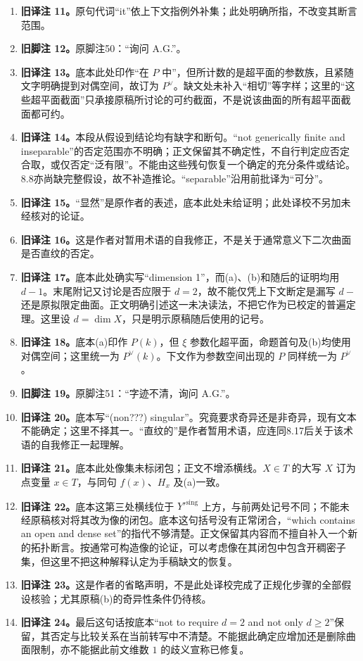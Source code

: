\begin{enumerate}
\item \textbf{旧译注 11。}原句代词“it”依上下文指例外补集；此处明确所指，不改变其断言范围。
\item \textbf{旧脚注 12。}原脚注50：“询问 A.G.”。
\item \textbf{旧译注 13。}底本此处印作“在 $P$ 中”，但所计数的是超平面的参数族，且紧随文字明确提到对偶空间，故订为 $P^\vee$。缺文处未补入“相切”等字样；这里的“这些超平面截面”只承接原稿所讨论的可约截面，不是说该曲面的所有超平面截面都可约。
\item \textbf{旧译注 14。}本段从假设到结论均有缺字和断句。“not generically finite and inseparable”的否定范围亦不明确；正文保留其不确定性，不自行判定应否定合取，或仅否定“泛有限”。不能由这些残句恢复一个确定的充分条件或结论。8.8亦尚缺完整假设，故不补造推论。“separable”沿用前批译为“可分”。
\item \textbf{旧译注 15。}“显然”是原作者的表述，底本此处未给证明；此处译校不另加未经核对的论证。
\item \textbf{旧译注 16。}这是作者对暂用术语的自我修正，不是关于通常意义下二次曲面是否直纹的否定。
\item \textbf{旧译注 17。}底本此处确实写“dimension 1”，而(a)、(b)和随后的证明均用 $d-1$。末尾附记又讨论是否应限于 $d=2$，故不能仅凭上下文断定是漏写 $d-$ 还是原拟限定曲面。正文明确引述这一未决读法，不把它作为已校定的普遍定理。这里设 $d=\dim X$，只是明示原稿随后使用的记号。
\item \textbf{旧译注 18。}底本(a)印作 $P(k)$，但 $\xi$ 参数化超平面，命题首句及(b)均使用对偶空间；这里统一为 $P^\vee(k)$。下文作为参数空间出现的 $P$ 同样统一为 $P^\vee$。
\item \textbf{旧脚注 19。}原脚注51：“字迹不清，询问 A.G.”。
\item \textbf{旧译注 20。}底本写“(non???) singular”。究竟要求奇异还是非奇异，现有文本不能确定；这里不择其一。“直纹的”是作者暂用术语，应连同8.17后关于该术语的自我修正一起理解。
\item \textbf{旧译注 21。}底本此处像集未标闭包；正文不增添横线。$X\in T$ 的大写 $X$ 订为点变量 $x\in T$，与同句 $f(x)$、$H_x$ 及(a)一致。
\item \textbf{旧译注 22。}底本这第三处横线位于 $Y'^{\mathrm{sing}}$ 上方，与前两处记号不同；不能未经原稿核对将其改为像的闭包。底本这句括号没有正常闭合，“which contains an open and dense set”的指代不够清楚。正文保留其内容而不擅自补入一个新的拓扑断言。按通常可构造像的论证，可以考虑像在其闭包中包含开稠密子集，但这里不把这种解释认定为手稿缺文的恢复。
\item \textbf{旧译注 23。}这是作者的省略声明，不是此处译校完成了正规化步骤的全部假设核验；尤其原稿(b)的奇异性条件仍待核。
\item \textbf{旧译注 24。}最后这句话按底本“not to require $d=2$ and not only $d\ge2$”保留，其否定与比较关系在当前转写中不清楚。不能据此确定应增加还是删除曲面限制，亦不能据此前文维数 $1$ 的歧义宣称已修复。
\end{enumerate}
\endgroup

